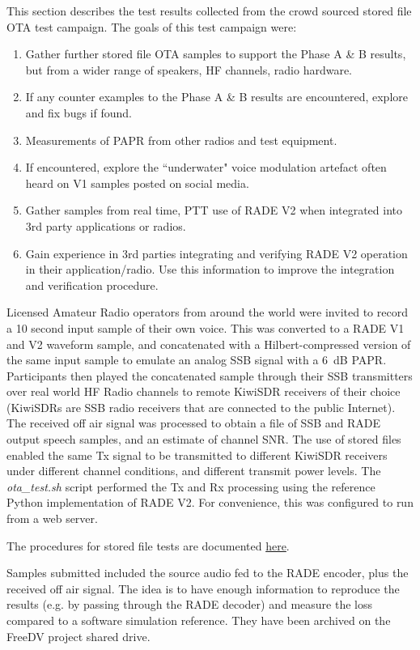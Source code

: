 \documentclass{article}
\begin{document}
This section describes the test results collected from the crowd sourced stored file OTA test campaign. The goals of this test campaign were:
\begin{enumerate}
\item Gather further stored file OTA samples to support the Phase A \& B results, but from a wider range of speakers, HF channels, radio hardware.
\item If any counter examples to the Phase A \& B results are encountered, explore and fix bugs if found.
\item Measurements of PAPR from other radios and test equipment.
\item If encountered, explore the ``underwater" voice modulation artefact often heard on V1 samples posted on social media.
\item Gather samples from real time, PTT use of RADE V2 when integrated into 3rd party applications or radios.
\item Gain experience in 3rd parties integrating and verifying RADE V2 operation in their application/radio. Use this information to improve the integration and verification procedure.
\end{enumerate}

Licensed Amateur Radio operators from around the world were invited to record a 10 second input sample of their own voice. 
This was converted to a RADE V1 and V2 waveform sample, and concatenated with a Hilbert-compressed version of the same input sample to emulate an analog SSB signal with a 6~dB PAPR.
Participants then played the concatenated sample through their SSB transmitters over real world HF Radio channels to remote KiwiSDR receivers of their choice (KiwiSDRs are SSB radio receivers that are connected to the public Internet). 
The received off air signal was processed to obtain a file of SSB and RADE output speech samples, and an estimate of channel SNR. 
The use of stored files enabled the same Tx signal to be transmitted to different KiwiSDR receivers under different channel conditions, and different transmit power levels.
The \emph{ota\_test.sh} script performed the Tx and Rx processing using the reference Python implementation of RADE V2. For convenience, this was configured to run from a web server.

The procedures for stored file tests are documented \href{https://github.com/drowe67/radae/blob/main/README.md#testing-rade}{here}.  

Samples submitted included the source audio fed to the RADE encoder, plus the received off air signal.  The idea is to have enough information to reproduce the results (e.g. by passing through the RADE decoder) and measure the loss compared to a software simulation reference. They have been archived on the FreeDV project shared drive.
\end{document}
